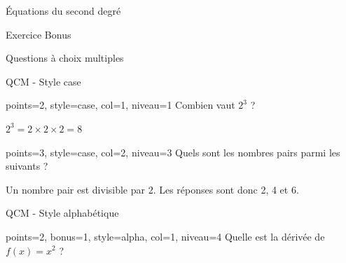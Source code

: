\documentclass[theme=vert]{nfdevoirs}
\begin{document}
\begin{devoir}
\begin{partie}{Équations du second degré}
\begin{exercice}{Exercice Bonus}
        \end{exercice}

    \end{partie}

    \begin{partie}{Questions à choix multiples}

        \begin{exercice}{QCM - Style case}

            \begin{qcm}{points=2, style=case, col=1, niveau=1}
                Combien vaut $2^3$ ?
                \begin{choix}
                \end{choix}
            \end{qcm}

            \begin{correction}
                $2^3 = 2 \times 2 \times 2 = 8$
            \end{correction}

            \begin{qcm}{points=3, style=case, col=2, niveau=3}
                Quels sont les nombres pairs parmi les suivants ?
                \begin{choix}
                \end{choix}
            \end{qcm}

            \begin{correction}
                Un nombre pair est divisible par 2. Les réponses sont donc 2, 4 et 6.
            \end{correction}

        \end{exercice}

        \begin{exercice}{QCM - Style alphabétique}

            \begin{qcm}{points=2, bonus=1, style=alpha, col=1, niveau=4}
                Quelle est la dérivée de $f(x) = x^2$ ?
                \begin{choix}
                \end{choix}
            \end{qcm}


\end{exercice}
\end{partie}
\end{devoir}
\end{document}
